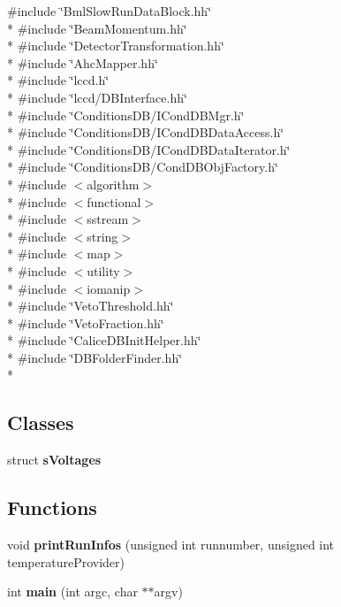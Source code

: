 {\ttfamily \#include \char`\"{}Bml\-Slow\-Run\-Data\-Block.\-hh\char`\"{}}\\*
{\ttfamily \#include \char`\"{}Beam\-Momentum.\-hh\char`\"{}}\\*
{\ttfamily \#include \char`\"{}Detector\-Transformation.\-hh\char`\"{}}\\*
{\ttfamily \#include \char`\"{}Ahc\-Mapper.\-hh\char`\"{}}\\*
{\ttfamily \#include \char`\"{}lccd.\-h\char`\"{}}\\*
{\ttfamily \#include \char`\"{}lccd/\-D\-B\-Interface.\-hh\char`\"{}}\\*
{\ttfamily \#include \char`\"{}Conditions\-D\-B/\-I\-Cond\-D\-B\-Mgr.\-h\char`\"{}}\\*
{\ttfamily \#include \char`\"{}Conditions\-D\-B/\-I\-Cond\-D\-B\-Data\-Access.\-h\char`\"{}}\\*
{\ttfamily \#include \char`\"{}Conditions\-D\-B/\-I\-Cond\-D\-B\-Data\-Iterator.\-h\char`\"{}}\\*
{\ttfamily \#include \char`\"{}Conditions\-D\-B/\-Cond\-D\-B\-Obj\-Factory.\-h\char`\"{}}\\*
{\ttfamily \#include $<$algorithm$>$}\\*
{\ttfamily \#include $<$functional$>$}\\*
{\ttfamily \#include $<$sstream$>$}\\*
{\ttfamily \#include $<$string$>$}\\*
{\ttfamily \#include $<$map$>$}\\*
{\ttfamily \#include $<$utility$>$}\\*
{\ttfamily \#include $<$iomanip$>$}\\*
{\ttfamily \#include \char`\"{}Veto\-Threshold.\-hh\char`\"{}}\\*
{\ttfamily \#include \char`\"{}Veto\-Fraction.\-hh\char`\"{}}\\*
{\ttfamily \#include \char`\"{}Calice\-D\-B\-Init\-Helper.\-hh\char`\"{}}\\*
{\ttfamily \#include \char`\"{}D\-B\-Folder\-Finder.\-hh\char`\"{}}\\*
\subsection*{Classes}
\begin{DoxyCompactItemize}
\item 
struct {\bf s\-Voltages}
\end{DoxyCompactItemize}
\subsection*{Functions}
\begin{DoxyCompactItemize}
\item 
void {\bfseries print\-Run\-Infos} (unsigned int runnumber, unsigned int temperature\-Provider)\label{displayRunInfo_8cc_a720d130f047b6e6f3429d0f37af442c3}

\item 
int {\bfseries main} (int argc, char $\ast$$\ast$argv)\label{displayRunInfo_8cc_a3c04138a5bfe5d72780bb7e82a18e627}

\end{DoxyCompactItemize}


